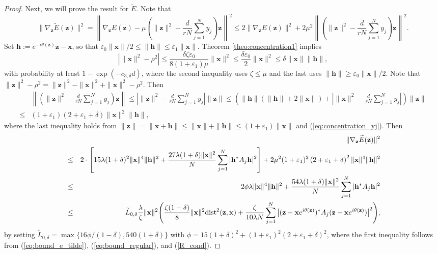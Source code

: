 \documentclass{article}
\renewcommand{\eqref}[1]{(\ref{#1})}
\newcommand{\dist}{{\rm dist}}
\newcommand{\vx}{{\mathbf x}}
\newcommand{\vz}{{\mathbf z}}
\newcommand{\vh}{{\mathbf h}}
\newcommand{\0}{{\mathbf 0}}
\numberwithin{equation}{section}
\begin{document}
\begin{proof}
		Next, we will prove the result for $\widetilde E$. Note that
		\begin{equation}\label{eq:bound_e_tilde}
			\|\nabla_{\vz} \widetilde E(\vz)\|^2=\left\|\nabla_{\vz} E(\vz)-\mu\left(\|\vz\|^2-\frac{d}{rN}\sum^N_{j=1}y_j\right)\vz\right\|^2\le2\|\nabla_{\vz} E(\vz)\|^2+2\mu^2\left\|\left(\|\vz\|^2-\frac{d}{rN}\sum^N_{j=1}y_j\right)\vz\right\|^2.
		\end{equation}
		Set $\vh:=e^{-i\theta(\vz)}\vz-\vx$, so that $\varepsilon_0\|\vx\|/2\le \|\vh\|\le\varepsilon_1\|\vx\|$.  Theorem \ref{theo:concentration1} implies
		\begin{equation}\label{eq:concentration_yj}
			\left|\|\vx\|^2-\rho^2\right|
			\le\frac{\delta\zeta\varepsilon_0}{8(1+\varepsilon_1)\mu}\|\vx\|^2
			\le\frac{\delta\varepsilon_0}{2}\|\vx\|^2
			\le\delta\|\vx\|\|\vh\|,
		\end{equation}
		with probability at least $1-\exp(-c_{3,\delta}d)$, where the second inequality uses $\zeta\le\mu$ and the last uses $\|\vh\|\ge\varepsilon_0\|\vx\|/2$. Note that $\|\vz\|^2-\rho^2=\|\vz\|^2-\|\vx\|^2+\|\vx\|^2-\rho^2$. Then 
		\begin{align}
			&\left\|\left(\|\vz\|^2-\frac{d}{rN}\sum^N_{j=1}y_j\right)\vz\right\|\le\left|\|\vz\|^2-\frac{d}{rN}\sum^N_{j=1}y_j\right|\|\vz\|
			\le\left(\|\vh\|(\|\vh\|+2\|\vx\|)+\left|\|\vx\|^2-\frac{d}{rN}\sum^N_{j=1}y_j\right|\right)\|\vz\|\nonumber\\
			\le&(1+\varepsilon_1)\left(2+\varepsilon_1+\delta\right)\|\vx\|^2\|\vh\|,\label{eq:bound_regular}
		\end{align}
		where the last inequality holds from $\|\vz\|=\|\vx+\vh\|\le\|\vx\|+\|\vh\|\le(1+\varepsilon_1)\|\vx\|$ and \eqref{eq:concentration_yj}. 
		Then
		\begin{eqnarray*}
			&&\|\nabla_{\vz} \widetilde E(\vz)\|^2\\
			&\le&2\cdot\left[15\lambda(1+\delta)^2\|\vx\|^4\|\vh\|^2+\frac{27\lambda(1+\delta)\|\vx\|^2}{N}\sum^N_{j=1}|\vh^*A_j\vh|^2\right]+2\mu^2(1+\varepsilon_1)^2\left(2+\varepsilon_1+\delta\right)^2\|\vx\|^4\|\vh\|^2\\
			&\le&2\phi\lambda\|\vx\|^4\|\vh\|^2+\frac{54\lambda(1+\delta)\|\vx\|^2}{N}\sum^N_{j=1}|\vh^*A_j\vh|^2\\
			&\le&\widetilde L_{0,\delta}\frac{\lambda}{\zeta}\|\vx\|^2\Bigg(\frac{\zeta(1-\delta)}{8}\|\vx\|^2\dist^2(\vz, \vx)+\frac{\zeta}{10\lambda N}\sum_{j=1}^{N}\big|(\vz-\vx e^{i\theta(\vz)})^*A_j(\vz-\vx e^{i\theta(\vz)})\big|^2\Bigg),
		\end{eqnarray*} 
		by setting
		$\widetilde L_{0,\delta}=\max\{16\phi/(1-\delta),540(1+\delta)\}$ with $\phi=15(1+\delta)^2+(1+\varepsilon_1)^2(2+\varepsilon_1+\delta)^2$, where
		the first inequality follows from \eqref{eq:bound_e_tilde}, \eqref{eq:bound_regular}, and \eqref{R_cond}.  
	\end{proof}  
	
\end{document}
